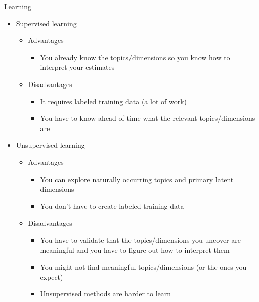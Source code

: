 \documentclass[pdf, 9pt, fleqn, handout]{beamer}
\begin{document}
\begin{frame}{Learning}
\begin{itemize}
\item Supervised learning \\[0.5em]
\begin{itemize}
\item Advantages \\[0.5em]
\begin{itemize}
\item You already know the topics/dimensions so you know how to interpret your estimates \\[0.5em]
\end{itemize}
\item Disadvantages \\[0.5em]
\begin{itemize}
\item It requires labeled training data (a lot of work) \\[0.5em]
\item You have to know ahead of time what the relevant topics/dimensions are \\[1em]
\end{itemize}
\end{itemize}
\item Unsupervised learning \\[0.5em]
\begin{itemize}
\item Advantages \\[0.5em]
\begin{itemize}
\item You can explore naturally occurring topics and primary latent dimensions \\[0.5em]
\item You don't have to create labeled training data \\[0.5em]
\end{itemize}
\item Disadvantages \\[0.5em]
\begin{itemize}
\item You have to validate that the topics/dimensions you uncover are meaningful and you have to figure out how to interpret them \\[0.5em]
\item You might not find meaningful topics/dimensions (or the ones you expect) \\[0.5em]
\item Unsupervised methods are harder to learn
\end{itemize}
\end{itemize}
\end{itemize}
\end{frame}
\end{document}
